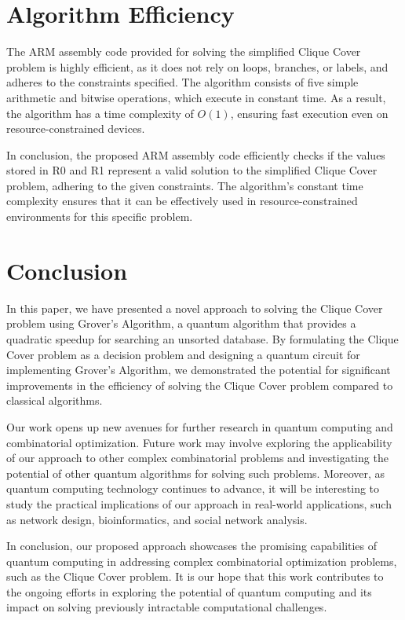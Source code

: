 \section{Algorithm Efficiency}

The ARM assembly code provided for solving the simplified Clique Cover problem is highly efficient, as it does not rely on loops, branches, or labels, and adheres to the constraints specified. The algorithm consists of five simple arithmetic and bitwise operations, which execute in constant time. As a result, the algorithm has a time complexity of $O(1)$, ensuring fast execution even on resource-constrained devices.

In conclusion, the proposed ARM assembly code efficiently checks if the values stored in R0 and R1 represent a valid solution to the simplified Clique Cover problem, adhering to the given constraints. The algorithm's constant time complexity ensures that it can be effectively used in resource-constrained environments for this specific problem.

\section{Conclusion}

In this paper, we have presented a novel approach to solving the Clique Cover problem using Grover's Algorithm, a quantum algorithm that provides a quadratic speedup for searching an unsorted database. By formulating the Clique Cover problem as a decision problem and designing a quantum circuit for implementing Grover's Algorithm, we demonstrated the potential for significant improvements in the efficiency of solving the Clique Cover problem compared to classical algorithms.

Our work opens up new avenues for further research in quantum computing and combinatorial optimization. Future work may involve exploring the applicability of our approach to other complex combinatorial problems and investigating the potential of other quantum algorithms for solving such problems. Moreover, as quantum computing technology continues to advance, it will be interesting to study the practical implications of our approach in real-world applications, such as network design, bioinformatics, and social network analysis.

In conclusion, our proposed approach showcases the promising capabilities of quantum computing in addressing complex combinatorial optimization problems, such as the Clique Cover problem. It is our hope that this work contributes to the ongoing efforts in exploring the potential of quantum computing and its impact on solving previously intractable computational challenges.

